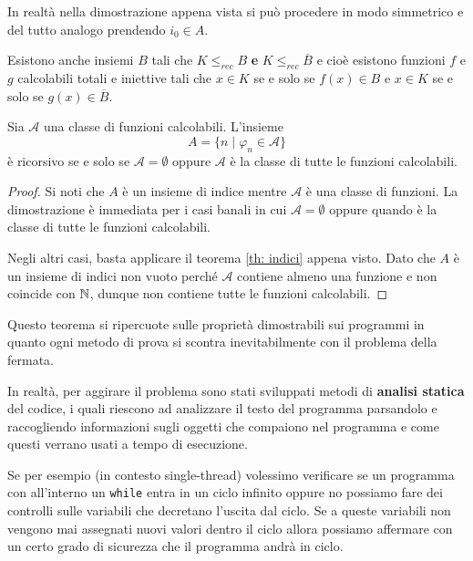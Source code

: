In realtà nella dimostrazione appena vista si può procedere in
modo simmetrico e del tutto analogo prendendo $i_0 \in A$.

Esistono anche insiemi $B$ tali che $K \leq_{rec} B$ \textbf{e}
$K \leq_{rec} \overline{B}$ e cioè esistono funzioni $f$ e $g$
calcolabili totali e iniettive tali che $x \in K$ se e solo se
$f(x) \in B$ e $x \in K$ se e solo se $g(x) \in \overline{B}$.

\begin{theorem} [Rice] \label{th: rice}
	Sia $\mathcal{A}$ una classe di funzioni calcolabili.
	L'insieme
	\[ A = \{ n \mid \varphi_n \in \mathcal{A} \} \]
	è ricorsivo se e solo se $\mathcal{A} = \emptyset$ oppure
	$\mathcal{A}$ è la classe di tutte le funzioni calcolabili.
	\begin{proof}
		Si noti che $A$ è un insieme di indice mentre
		$\mathcal{A}$ è una classe di funzioni. La dimostrazione
		è immediata per i casi banali in cui
		$\mathcal{A} = \emptyset$ oppure quando è la classe di
		tutte le funzioni calcolabili.

		Negli altri casi, basta applicare il teorema
		\ref{th: indici} appena visto. Dato che $A$ è un insieme
		di indici non vuoto perché $\mathcal{A}$ contiene almeno
		una funzione e non coincide con $\mathbb{N}$, dunque non contiene
		tutte le funzioni calcolabili.
	\end{proof}
\end{theorem}

Questo teorema si ripercuote sulle proprietà dimostrabili sui
programmi in quanto ogni metodo di prova si scontra
inevitabilmente con il problema della fermata.

In realtà, per aggirare il problema sono stati sviluppati metodi
di \textbf{analisi statica} del codice, i quali riescono ad
analizzare il testo del programma parsandolo e raccogliendo
informazioni sugli oggetti che compaiono nel programma e come
questi verrano usati a tempo di esecuzione.

Se per esempio (in contesto single-thread) volessimo verificare
se un programma con all'interno un \verb|while| entra in un
ciclo infinito oppure no possiamo fare dei controlli sulle
variabili che decretano l'uscita dal ciclo. Se a queste variabili
non vengono mai assegnati nuovi valori dentro il ciclo allora
possiamo affermare con un certo grado di sicurezza che il
programma andrà in ciclo.
